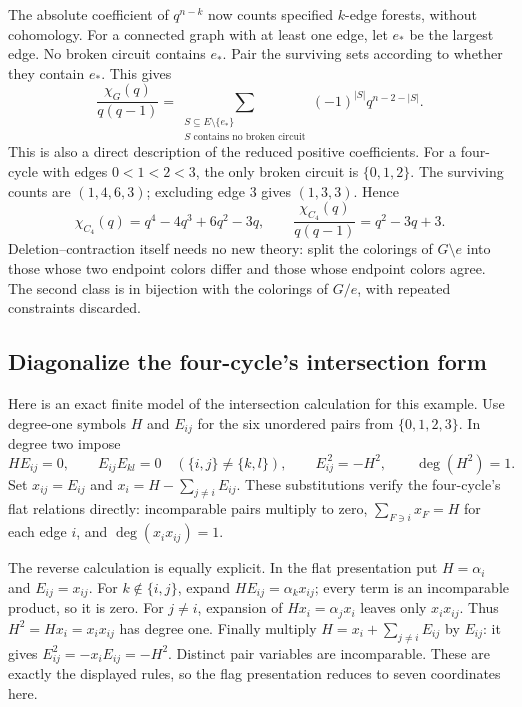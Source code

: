 \documentclass[11pt]{article}
\theoremstyle{definition}
\theoremstyle{remark}
\begin{document}
The absolute coefficient of $q^{n-k}$ now counts specified $k$-edge forests, without cohomology. For a connected graph with at least one edge, let $e_*$ be the largest edge. No broken circuit contains $e_*$. Pair the surviving sets according to whether they contain $e_*$. This gives
\[
 \frac{\chi_G(q)}{q(q-1)}
 =\sum_{\substack{S\subseteq E\setminus\{e_*\}\\
                         S\text{ contains no broken circuit}}}
                  (-1)^{|S|}q^{n-2-|S|}.
\]
This is also a direct description of the reduced positive coefficients. For a four-cycle with edges $0<1<2<3$, the only broken circuit is $\{0,1,2\}$. The surviving counts are $(1,4,6,3)$; excluding edge $3$ gives $(1,3,3)$. Hence
\[
 \chi_{C_4}(q)=q^4-4q^3+6q^2-3q,
 \qquad \frac{\chi_{C_4}(q)}{q(q-1)}=q^2-3q+3.
\]
Deletion--contraction itself needs no new theory: split the colorings of $G\setminus e$ into those whose two endpoint colors differ and those whose endpoint colors agree. The second class is in bijection with the colorings of $G/e$, with repeated constraints discarded.

\subsection{Diagonalize the four-cycle's intersection form}
\label{sec:finite-intersection-calculus}

Here is an exact finite model of the intersection calculation for this example. Use degree-one symbols $H$ and $E_{ij}$ for the six unordered pairs from $\{0,1,2,3\}$. In degree two impose
\[
 HE_{ij}=0,\qquad E_{ij}E_{kl}=0\quad(\{i,j\}\ne\{k,l\}),
 \qquad E_{ij}^{\,2}=-H^2,
 \qquad \deg(H^2)=1.
\]
Set $x_{ij}=E_{ij}$ and $x_i=H-\sum_{j\ne i}E_{ij}$. These substitutions verify the four-cycle's flat relations directly: incomparable pairs multiply to zero, $\sum_{F\ni i}x_F=H$ for each edge $i$, and $\deg(x_i x_{ij})=1$.

The reverse calculation is equally explicit. In the flat presentation put $H=\alpha_i$ and $E_{ij}=x_{ij}$. For $k\notin\{i,j\}$, expand $HE_{ij}=\alpha_kx_{ij}$; every term is an incomparable product, so it is zero. For $j\ne i$, expansion of $Hx_i=\alpha_jx_i$ leaves only $x_ix_{ij}$. Thus $H^2=Hx_i=x_ix_{ij}$ has degree one. Finally multiply $H=x_i+\sum_{j\ne i}E_{ij}$ by $E_{ij}$: it gives $E_{ij}^2=-x_iE_{ij}=-H^2$. Distinct pair variables are incomparable. These are exactly the displayed rules, so the flag presentation reduces to seven coordinates here.
\end{document}
